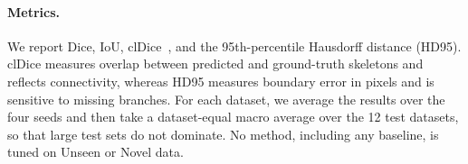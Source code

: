 \paragraph{Metrics.}
We report Dice, IoU, clDice~\cite{shit2021cldice}, and the 95th-percentile
Hausdorff distance (HD95).  clDice measures overlap between predicted and
ground-truth skeletons and reflects connectivity, whereas HD95 measures
boundary error in pixels and is sensitive to missing branches.  For each
dataset, we average the results over the four seeds and then take a
dataset-equal macro average over the 12 test datasets, so that large test
sets do not dominate.  No
method, including any baseline, is tuned on Unseen or Novel data.
